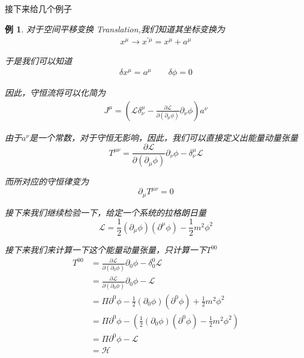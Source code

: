 \documentclass{article}
\newtheorem{example}{例}
\begin{document}
接下来给几个例子
\begin{example}
    对于空间平移变换 Translation,我们知道其坐标变换为
    \begin{align*}
        x^\mu\to x^{\prime\mu}=x^\mu+a^\mu
    \end{align*}

    于是我们可以知道
    \begin{align*}
        \delta x^\mu=a^\mu\quad\quad\delta\phi=0
    \end{align*}

    因此，守恒流将可以化简为
    \begin{align*}
        J^\mu=\left(\mathcal{L}\delta^\mu_\nu-\frac{\partial\mathcal{L}}{\partial(\partial_\mu\phi)}\partial_\nu\phi\right)a^\nu
    \end{align*}

    由于$a^\nu$是一个常数，对于守恒无影响，因此，我们可以直接定义出能量动量张量
    \begin{equation*}
        T^{\mu\nu}=\frac{\partial\mathcal{L}}{\partial(\partial_\mu\phi)}\partial_\nu\phi-\delta^\mu_\nu\mathcal{L}
    \end{equation*}

    而所对应的守恒律变为
    \begin{equation*}
        \partial_\mu T^{\mu\nu}=0
    \end{equation*}

    接下来我们继续检验一下，给定一个系统的拉格朗日量
    \begin{equation*}
        \mathcal{L}=\frac{1}{2}(\partial_\mu\phi)(\partial^\mu\phi)-\frac{1}{2}m^2\phi^2
    \end{equation*}

    接下来我们来计算一下这个能量动量张量，只计算一下$T^{00}$
    \begin{align*}
        T^{00}&=\frac{\partial\mathcal{L}}{\partial(\partial_0\phi)}\partial_0\phi-\delta^0_0\mathcal{L}\\
        &=\frac{\partial\mathcal{L}}{\partial(\partial_0\phi)}\partial_0\phi-\mathcal{L}\\
        &=\Pi\partial^0\phi-\frac{1}{2}(\partial_0\phi)(\partial^0\phi)+\frac{1}{2}m^2\phi^2\\
        &=\Pi\partial^0\phi-\left(\frac{1}{2}(\partial_0\phi)(\partial^0\phi)-\frac{1}{2}m^2\phi^2\right)\\
        &=\Pi\partial^0\phi-\mathcal{L}\\
        &=\mathcal{H}
    \end{align*}
\end{example}
\end{document}
